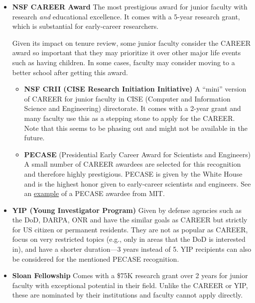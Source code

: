\documentclass[oneside,11pt]{book}
\begin{document}
\begin{itemize}
  \item \textbf{NSF CAREER Award} The most prestigious award for junior faculty with research \emph{and} educational excellence. It comes with a 5-year research grant, which is substantial for early-career researchers. 
  
  Given its impact on tenure review, some junior faculty consider the CAREER award so important that they may prioritize it over other major life events such as having children.
  In some cases, faculty may consider moving to a better school after getting this award.
  \begin{itemize}
    \item \textbf{NSF CRII (CISE Research Initiation Initiative)} A ``mini'' version of CAREER for junior faculty in CISE (Computer and Information Science and Engineering) directorate. It comes with a 2-year grant and many faculty use this as a stepping stone to apply for the CAREER. Note that this seems to be phasing out and might not be available in the future. 
    
    \item \textbf{PECASE} (Presidential Early Career Award for Scientists and Engineers) A small number of CAREER awardees are selected for this recognition and therefore highly prestigious. PECASE is given by the White House and is the highest honor given to early-career scientists and engineers. See an \href{https://www.csail.mit.edu/news/csails-broderick-and-carbin-earn-presidential-early-career-awards}{example} of a PECASE awardee from MIT.
  \end{itemize}  
  
  \item \textbf{YIP (Young Investigator Program)} Given by defense agencies such as the DoD, DARPA, ONR and have the similar goals as CAREER but strictly for US citizen or permanent residents. They are not as popular as CAREER, focus on very restricted topics (e.g., only in areas that the DoD is interested in), and have a shorter duration---3 years instead of 5. YIP recipients can also be considered for the mentioned PECASE recognition.
  
  \item \textbf{Sloan Fellowship}  Comes with a \$75K research grant over 2 years for junior faculty with exceptional potential in their field. Unlike the CAREER or YIP, these are nominated by their institutions and faculty cannot apply directly.
  
\end{itemize} 
\end{document}
